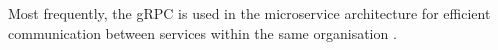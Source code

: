 Most frequently, the gRPC is used in the microservice architecture for efficient communication between services within the same organisation \cite{DesignDataIntensiveApplications}.









